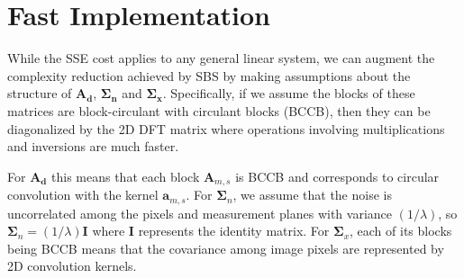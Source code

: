\documentclass{article}
\providecommand{\norm}[1]{\left\lVert#1\right\rVert}
\DeclareMathOperator*{\argmin}{arg\,min}
\begin{document}


\section{Fast Implementation}
While the SSE cost applies to any general linear system, we can augment the
complexity reduction achieved by SBS by making assumptions about the structure
of $\bm{A}_{\bm{d}}$, $\bm{\Sigma}_{\bm{n}}$ and $\bm{\Sigma}_{\bm{x}}$.
Specifically, if we assume the blocks of these matrices are block-circulant with
circulant blocks (BCCB), then they can be diagonalized by the 2D DFT matrix
where operations involving multiplications and inversions are much faster.

For $\bm{A}_{\bm{d}}$ this means that each block $\bm A_{m,s}$ is BCCB and
corresponds to circular convolution with the kernel $\bm a_{m,s}$. For $\bm
\Sigma_n$, we assume that the noise is uncorrelated among the pixels and
measurement planes with variance $(1/\lambda)$, so $\bm \Sigma_n=(1/\lambda) \bm
I$ where $\bm I$ represents the identity matrix. For $\bm \Sigma_x$, each of its
blocks being BCCB means that the covariance among image pixels are represented
by 2D convolution kernels.
\end{document}
